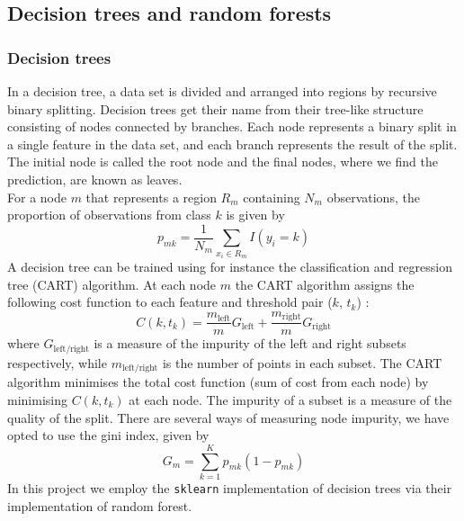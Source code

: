 \documentclass[notitlepage, reprint, nofootinbib]{revtex4-1}
\begin{document}
\subsection{Decision trees and random forests}
\subsubsection{Decision trees}
In a decision tree, a data set is divided and arranged into regions by recursive binary splitting. \cite{ISL} Decision trees get their name from their tree-like structure consisting of nodes connected by branches. Each node represents a binary split in a single feature in the data set, and each branch represents the result of the split. The initial node is called the root node and the final nodes, where we find the prediction, are known as leaves. \\[2mm]
For a node $m$ that represents a region $R_m$ containing $N_m$ observations, the proportion of observations from class $k$ is given by \cite{ESL}
\begin{equation} p_{mk}=\frac{1}{N_m}\sum_{x_i \in R_m}I(y_i=k)\end{equation}
A decision tree can be trained using for instance the classification and regression tree (CART) algorithm. At each node $m$ the CART algorithm assigns the following cost function to each feature and threshold pair ($k$, $t_k$) \cite{lecturenotes1}:
\begin{equation}C(k, t_k)=\frac{m_{\text{left}}}{m}G_{\text{left}}+\frac{m_{\text{right}}}{m}G_{\text{right}}\end{equation}
where $G_{\text{left/right}}$ is a measure of the impurity of the left and right subsets respectively, while $m_{\text{left/right}}$ is the number of points in each subset. The CART algorithm minimises the total cost function (sum of cost from each node) by minimising $C(k, t_k)$ at each node.
\newpage
The impurity of a subset is a measure of the quality of the split. There are several ways of measuring node impurity, we have opted to use the gini index, given by \cite{ESL}
\begin{equation} G_m=\sum_{k=1}^{K}p_{mk}(1-p_{mk})\end{equation}
In this project we employ the \texttt{sklearn} implementation \cite{scikit-learn} of decision trees via their implementation of random forest. 
\end{document}
